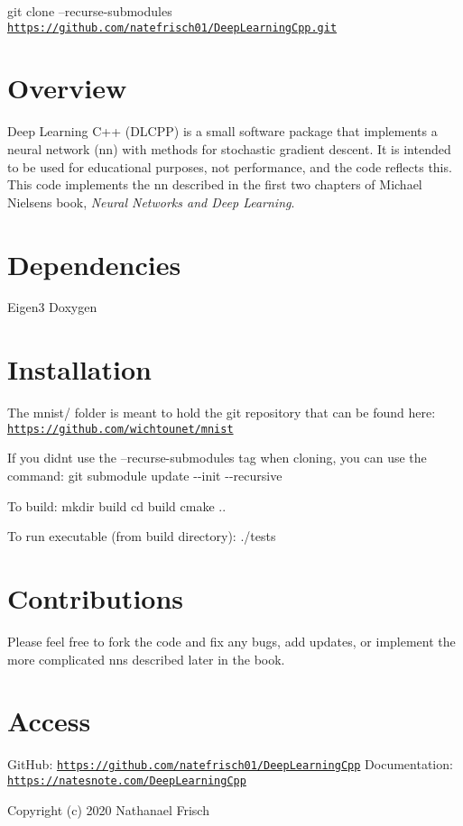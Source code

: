 git clone --recurse-\/submodules \href{https://github.com/natefrisch01/DeepLearningCpp.git}{\tt https\+://github.\+com/natefrisch01/\+Deep\+Learning\+Cpp.\+git}

\section*{Overview}

Deep Learning C++ (D\+L\+C\+PP) is a small software package that implements a neural network (nn) with methods for stochastic gradient descent. It is intended to be used for educational purposes, not performance, and the code reflects this. This code implements the nn described in the first two chapters of Michael Nielsen\textquotesingle{}s book, {\itshape Neural Networks and Deep Learning}.

\section*{Dependencies}

Eigen3 Doxygen

\section*{Installation}

The mnist/ folder is meant to hold the git repository that can be found here\+: \href{https://github.com/wichtounet/mnist}{\tt https\+://github.\+com/wichtounet/mnist}

If you didn\textquotesingle{}t use the --recurse-\/submodules tag when cloning, you can use the command\+: {\ttfamily git submodule update -\/-\/init -\/-\/recursive}

To build\+: {\ttfamily mkdir build} {\ttfamily cd build} {\ttfamily cmake ..}

To run executable (from build directory)\+: {\ttfamily ./tests}

\section*{Contributions}

Please feel free to fork the code and fix any bugs, add updates, or implement the more complicated nn\textquotesingle{}s described later in the book.

\section*{Access}

Git\+Hub\+: \href{https://github.com/natefrisch01/DeepLearningCpp}{\tt https\+://github.\+com/natefrisch01/\+Deep\+Learning\+Cpp} Documentation\+: \href{https://natesnote.com/DeepLearningCpp}{\tt https\+://natesnote.\+com/\+Deep\+Learning\+Cpp}

Copyright (c) 2020 Nathanael Frisch 